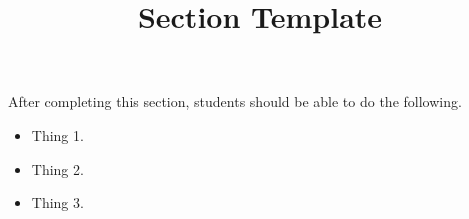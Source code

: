 \documentclass{ximera}
\title{Section Template}
\begin{document}
\begin{abstract}
\end{abstract}

\maketitle

\begin{sectionOutcomes}

After completing this section, students should be able to do the following.

\begin{itemize}
\item Thing 1.
\item Thing 2.
\item Thing 3.
\end{itemize}

\end{sectionOutcomes}
\end{document}
